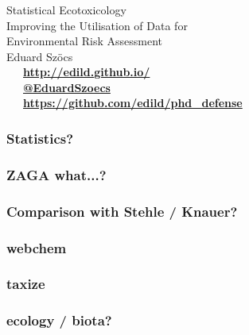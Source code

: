 \documentclass[10pt
]{beamer}
\begin{document}
\begin{frame}[standout]
	\frametitle{}

	\vspace{1em}
	\Huge{Statistical Ecotoxicology} \\[0.3em]
	\large{Improving the Utilisation of Data for \\ Environmental Risk Assessment} \\[1em]

	\normalsize
	Eduard Szöcs \\[3em]

	\faLaptop~~~\textbf{\href{http://edild.github.io/}{http://edild.github.io/ }}\\[.5em]
	\faTwitter~~~\textbf{\href{http://twitter.com/EduardSzoecs}{@EduardSzoecs}} 	\\[0.5em]
	\faGift~~~\textbf{\href{https://github.com/edild/talk_work2}{https://github.com/edild/phd\_defense}}\\[4em]

	\begin{center}\ccbysa\end{center} 

\end{frame}


\appendix

\begin{frame}
\frametitle{Statistics?}

\end{frame}


\begin{frame}
\frametitle{ZAGA what...?}

\end{frame}


\begin{frame}
\frametitle{Comparison with Stehle / Knauer?}

\end{frame}


\begin{frame}
\frametitle{webchem}

\end{frame}


\begin{frame}
\frametitle{taxize}

\end{frame}


\begin{frame}
\frametitle{ecology / biota?}

\end{frame}


\end{document}
